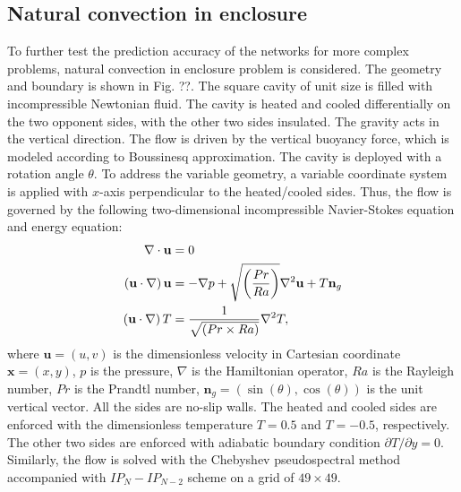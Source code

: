 \documentclass[preprint, 10pt]{elsarticle}
\begin{document}
\subsection{Natural convection in enclosure}
To further test the prediction accuracy of the networks for more complex problems, natural convection in enclosure problem is considered. The geometry and boundary is shown in Fig. ??. The square cavity of unit size is filled with incompressible Newtonian fluid. The cavity is heated and cooled differentially on the two opponent sides, with the other two sides insulated. The gravity acts in the vertical direction. The flow is driven by the vertical buoyancy force, which is modeled according to Boussinesq approximation. The cavity is deployed with a rotation angle $\theta$. To address the variable geometry, a variable coordinate system is applied with $x$-axis perpendicular to the heated/cooled sides.
Thus, the flow is governed by the following two-dimensional incompressible Navier-Stokes equation and energy equation:
\begin{equation}
\begin{aligned}
\nabla  \cdot {\bf{u}} &= 0 \\
\left( {{\bf{u}} \cdot \nabla } \right){\bf{u}} &=  - \nabla p + \sqrt{\left(\frac{Pr}{Ra}\right)}{\nabla ^2}{\bf{u}} + T\mathbf{n}_g \\
\left( {{\bf{u}} \cdot \nabla } \right)T        &=  \frac{1}{\sqrt{\left({Pr}\times{Ra}\right)}}{\nabla ^2}T,
\end{aligned}
\label{eq_GoverningEqsNaturalConvection}
\end{equation}
where $\mathbf{u}=(u,v)$ is the dimensionless velocity in Cartesian coordinate $\mathbf{x}=(x,y)$, $p$ is the pressure, $\nabla$ is the  Hamiltonian operator, $Ra$ is the Rayleigh number, $Pr$ is the Prandtl number, $\mathbf{n}_g=\left(\sin(\theta),\cos(\theta) \right)$ is the unit vertical vector. All the sides are no-slip walls. The heated and cooled sides are enforced with the dimensionless temperature $T=0.5$ and $T=-0.5$, respectively. The other two sides are enforced with adiabatic boundary condition $\partial T / \partial y=0$.
Similarly, the flow is solved with the Chebyshev pseudospectral method accompanied with $IP_{N}-IP_{N-2}$ scheme on a grid of $49 \times 49$.
\end{document}
